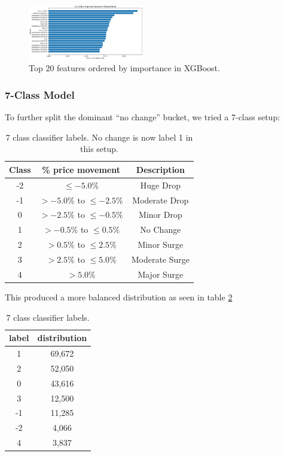 \documentclass[twocolumn]{article}
\begin{document}
\begin{figure}[h!]
    \centering
    \includegraphics[width=0.45\textwidth]{5_class_xgboost_important_features.png}
    \caption{Top 20 features ordered by importance in XGBoost.}
    \label{fig:5-class-feature-importance}
\end{figure}


\subsubsection*{7-Class Model}

To further split the dominant “no change” bucket, we tried a 7-class setup:

\begin{table}[h!]
\centering
\small
\begin{tabular}{|c|c|c|}
\hline
\textbf{Class} & \textbf{\% price movement} & \textbf{Description} \\
\hline
-2 & $\leq -5.0\%$ & Huge Drop  \\
-1 & $> -5.0\%$ to $\leq -2.5\%$ & Moderate Drop  \\
 0 & $> -2.5\%$ to $\leq -0.5\%$ & Minor Drop \\
 1 & $> -0.5\%$ to $\leq 0.5\%$ & No Change  \\
 2 & $> 0.5\%$ to $\leq 2.5\%$ & Minor Surge  \\
 3 & $> 2.5\%$ to $\leq 5.0\%$ & Moderate Surge  \\
 4 & $> 5.0\%$ & Major Surge  \\
\hline
\end{tabular}
\caption{7 class classifier labels. No change is now label 1 in this setup.}
\label{tab:7-class-labels}
\end{table}


This produced a more balanced distribution as seen in table \ref{tab:7-class-distribution}

\begin{table}[h!]
\centering
\small
\begin{tabular}{|c|c|}
\hline
\textbf{label} & \textbf{distribution} \\
\hline
   1  &  69,672 \\
   2  &  52,050 \\
   0  &  43,616 \\
   3  &  12,500 \\
  -1  &  11,285 \\
  -2  &   4,066 \\
   4  &   3,837 \\
\hline
\end{tabular}
\caption{7 class classifier labels.}
\label{tab:7-class-distribution}
\end{table}
\end{document}
